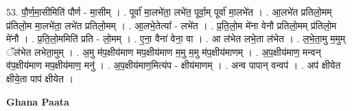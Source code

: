 \documentclass[17pt]{extarticle}
\begin{document}
53. पौ॒र्ण॒मा॒सीमिति॑ पौर्ण - मा॒सीम् । . पूर्वा॑ मा॒लभे॑ता॒ लभे॑त॒ पूर्वा॒म् पूर्वा॑ मा॒लभे॑त । . आ॒लभे॑त प्रतिलो॒मम् प्र॑तिलो॒म मा॒लभे॑ता॒ लभे॑त प्रतिलो॒मम् । . आ॒लभे॒तेत्या᳚ - लभे॑त । . प्र॒ति॒लो॒म मे॑ना वेनौ प्रतिलो॒मम् प्र॑तिलो॒म मे॑नौ । . प्र॒ति॒लो॒ममिति॑ प्रति - लो॒मम् । . ए॒ना॒ वैना॑ वेना॒ वा । . आ ल॑भेत लभे॒ता ल॑भेत । . ल॒भे॒ता॒मु म॒मुम् ॅल॑भेत लभेता॒मुम् । . अ॒मु म॑प॒क्षीय॑माण मप॒क्षीय॑माण म॒मु म॒मु म॑प॒क्षीय॑माणम् । . अ॒प॒क्षीय॑माण॒ मन्वन् व॑प॒क्षीय॑माण मप॒क्षीय॑माण॒ मनु॑ । . अ॒प॒क्षीय॑माण॒मित्य॑प - क्षीय॑माणम् । . अन्व पापान् वन्वप॑ । . अप॑ क्षीयेत क्षीये॒ता पाप॑ क्षीयेत । \newline

\textbf{Ghana Paata } \newline
\end{document}
